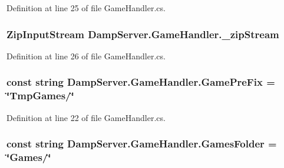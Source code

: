 Definition at line 25 of file Game\-Handler.\-cs.

\hypertarget{class_damp_server_1_1_game_handler_a30bafe4e4ca469e21f6fe3390df4976b}{
\subsubsection[{\-\_\-zip\-Stream}]{\setlength{\rightskip}{0pt plus 5cm}Zip\-Input\-Stream Damp\-Server.\-Game\-Handler.\-\_\-zip\-Stream\hspace{0.3cm}{\ttfamily [private]}}}\label{class_damp_server_1_1_game_handler_a30bafe4e4ca469e21f6fe3390df4976b}


Definition at line 26 of file Game\-Handler.\-cs.

\hypertarget{class_damp_server_1_1_game_handler_a05de78325b391198d3313cfeac1851cd}{
\subsubsection[{Game\-Pre\-Fix}]{\setlength{\rightskip}{0pt plus 5cm}const string Damp\-Server.\-Game\-Handler.\-Game\-Pre\-Fix = \char`\"{}Tmp\-Games/\char`\"{}\hspace{0.3cm}{\ttfamily [private]}}}\label{class_damp_server_1_1_game_handler_a05de78325b391198d3313cfeac1851cd}


Definition at line 22 of file Game\-Handler.\-cs.

\hypertarget{class_damp_server_1_1_game_handler_a60786795ee435b622c26f2554d662070}{
\subsubsection[{Games\-Folder}]{\setlength{\rightskip}{0pt plus 5cm}const string Damp\-Server.\-Game\-Handler.\-Games\-Folder = \char`\"{}Games/\char`\"{}\hspace{0.3cm}{\ttfamily [private]}}}\label{class_damp_server_1_1_game_handler_a60786795ee435b622c26f2554d662070}


